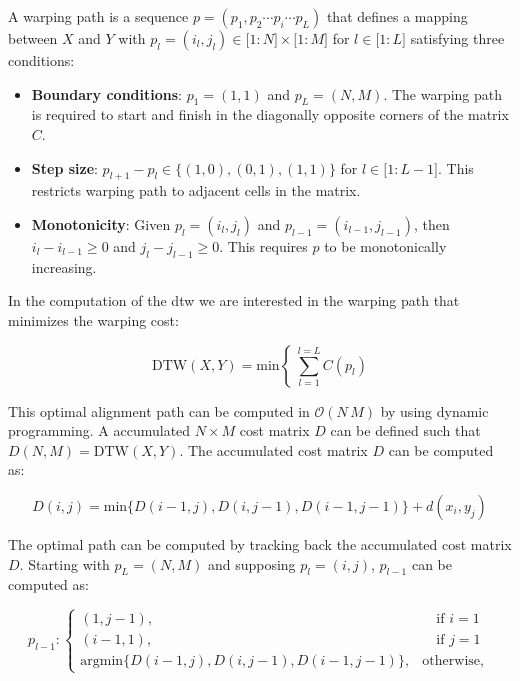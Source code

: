 A warping path is a sequence $p = (p_1, p_2 \cdots p_i \cdots p_L)$ that defines a mapping between $X$ and $Y$ with $p_l = (i_l, j_l) \in \lbrack 1:N\rbrack \times \lbrack1:M\rbrack$ for $ l \in \lbrack1:L\rbrack$ satisfying three conditions:

\begin{itemize}
	\item \textbf{Boundary conditions}: $p_1 = (1, 1)$ and $p_L = (N, M)$. The warping path is required to start and finish in the diagonally opposite corners of the matrix $C$.
	\item \textbf{Step size}: $p_{l+1}-p_l \in \lbrace (1,0), (0,1), (1,1) \rbrace$ for $l \in \lbrack 1: L-1 \rbrack$. This restricts warping path to adjacent cells in the matrix.
	\item \textbf{Monotonicity}: Given $p_l = (i_l, j_l)$ and $p_{l-1} = (i_{l-1}, j_{l-1})$, then $i_l - i_{l-1} \geq 0$ and $j_l - j_{l-1} \geq 0$. This requires $p$ to be monotonically increasing.
\end{itemize}

In the computation of the \gls{dtw} we are interested in the warping path that minimizes the warping cost:

\begin{equation}
\mathrm{DTW}(X,Y) = \mathrm{min} \left\lbrace ~\sum_{l=1}^{l=L}C(p_l)\right.
\end{equation}

This optimal alignment path can be computed in $\mathcal{O}(N\,M)$ by using dynamic programming. A accumulated $N \times M$ cost matrix $D$ can be defined such that $D(N,M) = \mathrm{DTW}(X,Y)$. The accumulated cost matrix $D$ can be computed as:

\begin{equation}
\label{eq:dtw_classic_cost_matrix_computation}
	D(i,j) = \mathrm{min} \lbrace D(i-1,j), D(i,j-1), D(i-1,j-1)\rbrace + d(x_i, y_j)
\end{equation}

The optimal path can be computed by tracking back the accumulated cost matrix $D$. Starting with $p_L = (N,M)$ and supposing $p_l = (i,j)$, $p_{l-1}$ can be computed as:

\begin{equation}
	p_{l-1} : \begin{cases}
	(1, j-1), & \quad \text{if } i=1\\
	(i-1, 1), & \quad \text{if } j=1\\	
	\mathrm{argmin} \lbrace D(i-1,j), D(i,j-1), D(i-1,j-1)\rbrace, & \mathrm{otherwise},
	\end{cases}
\end{equation}


